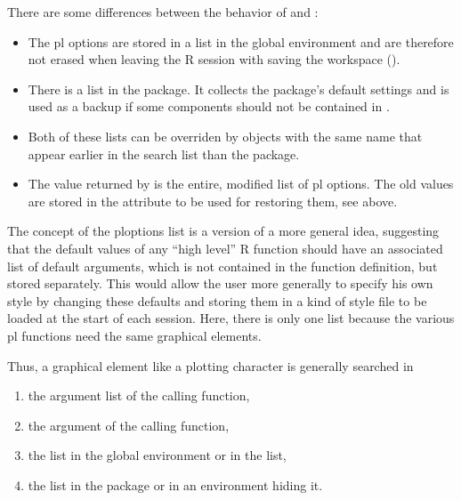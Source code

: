 \documentclass[11pt]{article}\usepackage[]{graphicx}\usepackage[]{color}
\begin{document}
There are some differences between the behavior of  and :
\begin{itemize}
\item 
The pl options are stored in a list  in the global
environment and are therefore not erased when leaving the R session with
saving the workspace ().
\item
There is a list  in the package. It collects the
package's default settings and is used as a backup if some components should
not be contained in .
\item
Both of these lists can be overriden by objects with the same name
that appear earlier in the search list than the  package.
\item
The value returned by  is the entire, modified list of 
pl options. The old values are stored in the attribute 
to be used for restoring them, see above.
\end{itemize}


\Remark
The concept of the ploptions list is a version of a more general idea, 
suggesting that the default values of any ``high level'' R function should 
have an associated list of default arguments, which is not contained in 
the function definition, but stored separately. 
This would allow the user more generally to specify his own style by 
changing these defaults and storing them in a kind of style file to be 
loaded at the start of each session. 
Here, there is only one list because the various pl functions need the 
same graphical elements.

Thus, a graphical element like a plotting character is generally searched 
in
\begin{enumerate}
\item 
  the argument list of the calling function,
\item
  the  argument of the calling function,
\item
  the  list in the global environment or in the  list,
\item
  the list  in the package 
  or in an environment hiding it.
\end{enumerate}
\end{document}
